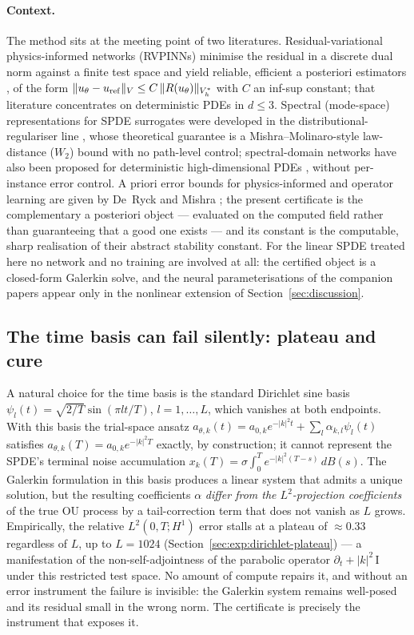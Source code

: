 \paragraph{Context.} The method sits at the meeting point of two
literatures. Residual-variational physics-informed networks (RVPINNs)
minimise the residual in a discrete dual norm against a finite test
space and yield reliable, efficient a posteriori estimators
\cite{RVPINN2024,Rojas2023}, of the form
$\|u_\theta - u_{\rm ref}\|_V \le C\,\|R(u_\theta)\|_{V_h^*}$ with $C$
an inf-sup constant; that literature concentrates on deterministic
PDEs in $d \le 3$. Spectral (mode-space) representations for SPDE
surrogates were developed in the distributional-regulariser line
\cite{paper1,paper5,paper6}, whose theoretical guarantee is a
Mishra--Molinaro-style \cite{Mishra2022} law-distance ($W_2$) bound
with no path-level control; spectral-domain networks have also been
proposed for deterministic high-dimensional PDEs \cite{YuOseledets2026},
without per-instance error control. A priori error bounds for
physics-informed and operator learning are given by De~Ryck and Mishra
\cite{DeRyckMishra2022}; the present certificate is the complementary
a posteriori object --- evaluated on the computed field rather than
guaranteeing that a good one exists --- and its constant is the
computable, sharp realisation of their abstract stability constant.
For the linear SPDE treated here no network and no training are
involved at all: the certified object is a closed-form Galerkin solve,
and the neural parameterisations of the companion papers appear only
in the nonlinear extension of Section~\ref{sec:discussion}.

\subsection{The time basis can fail silently: plateau and cure}
\label{sec:intro:halfperiod}

A natural choice for the time basis is the standard Dirichlet sine
basis $\psi_l(t) = \sqrt{2/T}\sin(\pi l t/T)$, $l = 1, \ldots, L$,
which vanishes at both endpoints. With this basis the trial-space
ansatz
$a_{\theta,k}(t) = a_{0,k} e^{-|k|^2 t} + \sum_l \alpha_{k,l}\psi_l(t)$
satisfies $a_{\theta,k}(T) = a_{0,k} e^{-|k|^2 T}$ exactly, by
construction; it cannot represent the SPDE's terminal noise
accumulation $x_k(T) = \sigma\int_0^T e^{-|k|^2(T-s)}\,dB(s)$. The
Galerkin formulation in this basis produces a linear system that
admits a unique solution, but the resulting coefficients $\alpha$
\emph{differ from the $L^2$-projection coefficients} of the true OU
process by a tail-correction term that does not vanish as $L$ grows.
Empirically, the relative $L^2(0,T;H^1)$ error stalls at a plateau of
$\approx 0.33$ regardless of $L$, up to $L = 1024$
(Section~\ref{sec:exp:dirichlet-plateau}) --- a manifestation of the
non-self-adjointness of the parabolic operator
$\partial_t + |k|^2\,\mathrm{I}$ under this restricted test space.
No amount of compute repairs it, and without an error instrument the
failure is invisible: the Galerkin system remains well-posed and its
residual small in the wrong norm. The certificate is precisely the
instrument that exposes it.

